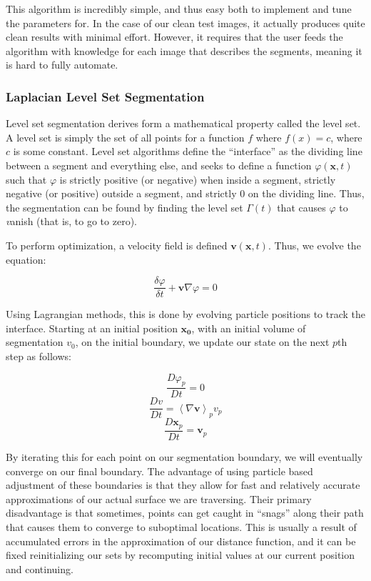 \documentclass{article}
\begin{document}
This algorithm is incredibly simple, and thus easy both to implement and tune the parameters for. In the case of our clean test images, it actually produces quite clean results with minimal effort. However, it requires that the user feeds the algorithm with knowledge for each image that describes the segments, meaning it is hard to fully automate.

\subsubsection*{Laplacian Level Set Segmentation}
Level set segmentation derives form a mathematical property called the level set. A level set is simply the set of all points for a function $f$ where $f(x) = c$, where $c$ is some constant. Level set algorithms define the ``interface'' as the dividing line between a segment and everything else, and seeks to define a function $\varphi(\mathbf{x},t)$ such that $\varphi$ is strictly positive (or negative) when inside a segment, strictly negative (or positive) outside a segment, and strictly $0$ on the dividing line. Thus, the segmentation can be found by finding the level set $\Gamma(t)$ that causes $\varphi$ to {\emph vanish} (that is, to go to zero).

To perform optimization, a velocity field is defined $\mathbf{v}(\mathbf{x},t)$. Thus, we evolve the equation\cite{osher}:

\[\frac{\delta\varphi}{\delta t} + \mathbf{v} \nabla\varphi = 0 \]

Using Lagrangian methods, this is done by evolving particle positions to track the interface. Starting at an initial position $\mathbf{x_0}$, with an initial volume of segmentation $v_0$, on the initial boundary, we update our state on the next $p$th step as follows\cite{hieber}:

\[\frac{D\varphi_p}{Dt} = 0 \]
\[\frac{Dv}{Dt} = \left< \nabla\mathbf{v}\right>_p v_p \]
\[\frac{D\mathbf{x}_p}{Dt} = \mathbf{v}_p \]

By iterating this for each point on our segmentation boundary, we will eventually converge on our final boundary. The advantage of using particle based adjustment of these boundaries is that they allow for fast and relatively accurate approximations of our actual surface we are traversing. Their primary disadvantage is that sometimes, points can get caught in ``snags'' along their path that causes them to converge to suboptimal locations. This is usually a result of accumulated errors in the approximation of our distance function, and it can be fixed reinitializing our sets by recomputing initial values at our current position and continuing\cite{hieber}.
\end{document}
